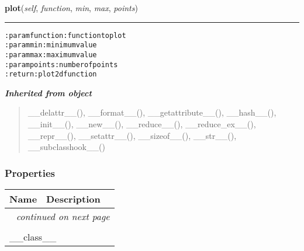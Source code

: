     \label{hal:maths:plotter:Plot2d:plot}

    \vspace{0.5ex}

\hspace{.8\funcindent}\begin{boxedminipage}{\funcwidth}

    \raggedright \textbf{plot}(\textit{self}, \textit{function}, \textit{min}, \textit{max}, \textit{points})

    \vspace{-1.5ex}

    \rule{\textwidth}{0.5\fboxrule}
\setlength{\parskip}{2ex}
\begin{alltt}

:param function: function to plot
:param min: minimum value
:param max: maximum value
:param points: number of points
:return: plot 2d function
\end{alltt}

\setlength{\parskip}{1ex}
    \end{boxedminipage}


\large{\textbf{\textit{Inherited from object}}}

\begin{quote}
\_\_delattr\_\_(), \_\_format\_\_(), \_\_getattribute\_\_(), \_\_hash\_\_(), \_\_init\_\_(), \_\_new\_\_(), \_\_reduce\_\_(), \_\_reduce\_ex\_\_(), \_\_repr\_\_(), \_\_setattr\_\_(), \_\_sizeof\_\_(), \_\_str\_\_(), \_\_subclasshook\_\_()
\end{quote}


  \subsubsection{Properties}

    \vspace{-1cm}
\hspace{\varindent}\begin{longtable}{|p{\varnamewidth}|p{\vardescrwidth}|l}
\cline{1-2}
\cline{1-2} \centering \textbf{Name} & \centering \textbf{Description}& \\
\cline{1-2}
\endhead\cline{1-2}\multicolumn{3}{r}{\small\textit{continued on next page}}\\\endfoot\cline{1-2}
\endlastfoot\multicolumn{2}{|l|}{\textit{Inherited from object}}\\
\multicolumn{2}{|p{\varwidth}|}{\raggedright \_\_class\_\_}\\
\cline{1-2}
\end{longtable}

